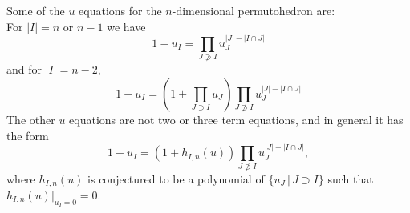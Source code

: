 \documentclass[hidelinks,12pt]{article}
\newcommand{\bea}[1]{\begin{eqnarray}\label{#1} }
\newcommand{\eea}{\end{eqnarray}}
\def\bea{\begin{eqnarray}}
\def\eea{\end{eqnarray}}
\begin{document}
Some of the $u$ equations for the $n$-dimensional permutohedron are:\\
For $|I|=n$ or $n-1$ we have  
\[
1-u_{I} = \prod_{J\not\supset I} u_{J}^{|J|-|I\cap J|}
\]
and for $|I| =n-2$,
\[
1-u_{I}= \left(1+\prod_{J\supset I}u_J\right)\prod_{J\not\supset I} u_{J}^{|J|-|I\cap J|}
\]
The other $u$ equations are not two or three term equations,
and in general it has the form 
\[
1-u_I=(1+h_{I,n}(u))\prod_{J\not\supset I} u_{J}^{|J|-|I\cap J|},
\]
where $h_{I,n}(u)$ is conjectured to be a polynomial of $\{u_J\,|\, J\supset I\}$ such that $h_{I,n}(u)|_{u_I=0}=0$.
\end{document}
